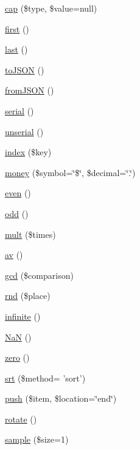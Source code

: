\begin{DoxyCompactItemize}
\item 
\hyperlink{classr_a6919ea74ebb93cd28fee10d172ebc4c4}{cap} (\$type, \$value=null)
\item 
\hyperlink{classr_ac73eef9ff76ea330c0dab36ca448b90d}{first} ()
\item 
\hyperlink{classr_ac90cadb327363232bb2d83a4f8ebd613}{last} ()
\item 
\hyperlink{classr_a2108d0f07e9bca6160bf5885703de972}{to\-J\-S\-O\-N} ()
\item 
\hyperlink{classr_ae456068dd57aa56c7fc891a526e67c32}{from\-J\-S\-O\-N} ()
\item 
\hyperlink{classr_a20d848af138f92c4604f0bcecce267e2}{serial} ()
\item 
\hyperlink{classr_a5664dc3d9f1d71ac463a833d37583e84}{unserial} ()
\item 
\hyperlink{classr_ada723c8fc4c1599c3f0a5a73698ef7fd}{index} (\$key)
\item 
\hyperlink{classr_a7755db2baa1c58774d9cf1c5c82676a1}{money} (\$symbol=\char`\"{}\$\char`\"{}, \$decimal=\char`\"{}.\char`\"{})
\item 
\hyperlink{classr_a046b5f5e8b171d4724f2780303239825}{even} ()
\item 
\hyperlink{classr_a666c4ea82d473f0e68ad97e3f33d1e83}{odd} ()
\item 
\hyperlink{classr_a57202f5e3d5e0a89e18aac7d96773cab}{mult} (\$times)
\item 
\hyperlink{classr_ad8c557c876471daa5dce718f01fd77b2}{av} ()
\item 
\hyperlink{classr_a0a13d13bfe0866bab479a700d059898b}{gcd} (\$comparison)
\item 
\hyperlink{classr_ab7cf083b6111db8f56b7d0b42cbba7a0}{rnd} (\$place)
\item 
\hyperlink{classr_a63f86e65e715320e6e292251810cd0b9}{infinite} ()
\item 
\hyperlink{classr_ae27ea99fd73ded7a863a154be23756d3}{Na\-N} ()
\item 
\hyperlink{classr_a75525252dfe9a4b2cc4e31bf066afe1c}{zero} ()
\item 
\hyperlink{classr_a977f683ea39406f1243565b0ee28bd5a}{srt} (\$method= 'sort')
\item 
\hyperlink{classr_a24a0a2d08214aa208efaf13be12b41fe}{push} (\$item, \$location=\char`\"{}end\char`\"{})
\item 
\hyperlink{classr_a74e94d71195d9cbb9c9e3bca3353d912}{rotate} ()
\item 
\hyperlink{classr_ace98c3b631ca27cdb027bbe389ef8628}{sample} (\$size=1)

\end{DoxyCompactItemize}
